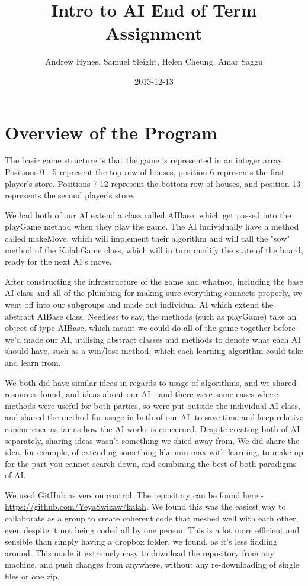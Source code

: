 \documentclass[11pt]{article}
\author{Andrew Hynes, Samuel Sleight, Helen Cheung, Amar Saggu}
\date{2013-12-13}
\title{Intro to AI End of Term Assignment}
\begin{document}
\maketitle
\tableofcontents


\section{Overview of the Program}
\label{sec-1}

The basic game structure is that the game is represented in an integer array. Positions 0 - 5 represent the top row of houses, position 6 represents the first player's store. Positions 7-12 represent the bottom row of houses, and position 13 represents the second player's store.

We had both of our AI extend a class called AIBase, which get passed into the playGame method when they play the game. The AI individually have a method called makeMove, which will implement their algorithm and will call the "sow" method of the KalahGame class, which will in turn modify the state of the board, ready for the next AI's move.

After constructing the infrastructure of the game and whatnot, including the base AI class and all of the plumbing for making sure everything connects properly, we went off into our subgroups and made out individual AI which extend the abstract AIBase class. Needless to say, the methods (such as playGame) take an object of type AIBase, which meant we could do all of the game together before we'd made our AI, utilising abstract classes and methods to denote what each AI should have, such as a win/lose method, which each learning algorithm could take and learn from.

We both did have similar ideas in regards to usage of algorithms, and we shared resources found, and ideas about our AI - and there were some cases where methods were useful for both parties, so were put outside the individual AI class, and shared the method for usage in both of our AI, to save time and keep relative concurrence as far as how the AI works is concerned. Despite creating both of AI separately, sharing ideas wasn't something we shied away from. We did share the idea, for example, of extending something like min-max with learning, to make up for the part you cannot search down, and combining the best of both paradigms of AI.

We used GitHub as version control. The repository can be found here - \url{https://github.com/YeyaSwizaw/kalah}. We found this was the easiest way to collaborate as a group to create coherent code that meshed well with each other, even despite it not being coded all by one person. This is a lot more efficient and sensible than simply having a dropbox folder, we found, as it's less fiddling around. This made it extremely easy to download the repository from any machine, and push changes from anywhere, without any re-downloading of single files or one zip.
\end{document}
